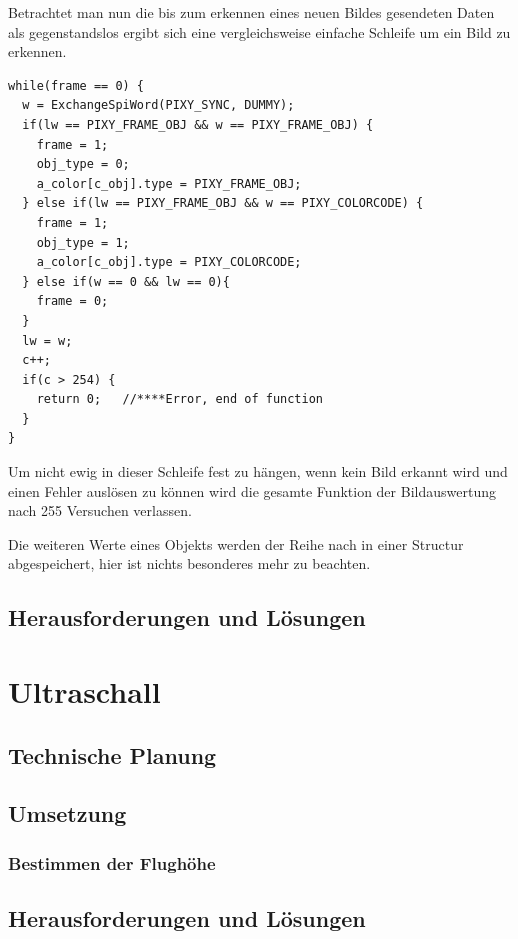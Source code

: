     Betrachtet man nun die bis zum erkennen eines neuen Bildes gesendeten Daten als gegenstandslos ergibt sich eine vergleichsweise einfache Schleife um ein Bild zu erkennen.

    \lstset{language = c}
    \begin{lstlisting}
while(frame == 0) {
  w = ExchangeSpiWord(PIXY_SYNC, DUMMY);
  if(lw == PIXY_FRAME_OBJ && w == PIXY_FRAME_OBJ) {
    frame = 1;
    obj_type = 0;
    a_color[c_obj].type = PIXY_FRAME_OBJ;
  } else if(lw == PIXY_FRAME_OBJ && w == PIXY_COLORCODE) {
    frame = 1;
    obj_type = 1;
    a_color[c_obj].type = PIXY_COLORCODE;
  } else if(w == 0 && lw == 0){
    frame = 0;
  }
  lw = w;
  c++;
  if(c > 254) {
    return 0;	//****Error, end of function
  }
}
    \end{lstlisting}
    Um nicht ewig in dieser Schleife fest zu hängen, wenn kein Bild erkannt wird und einen Fehler auslösen zu können wird die gesamte Funktion der Bildauswertung nach 255 Versuchen verlassen.

    Die weiteren Werte eines Objekts werden der Reihe nach in einer Structur abgespeichert, hier ist nichts besonderes mehr zu beachten.
    
  \subsection{Herausforderungen und Lösungen}

\section{Ultraschall}

  \subsection{Technische Planung}

  \subsection{Umsetzung}

    \subsubsection{Bestimmen der Flughöhe}

  \subsection{Herausforderungen und Lösungen}

